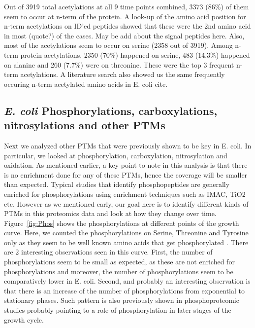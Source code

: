 \documentclass[12pt]{article}
\begin{document}
Out of 3919 total acetylations at all 9 time points combined, 3373 (86\%) of them seem to occur at n-term of the protein. A look-up of the amino acid position for n-term acetylations on ID'ed peptides showed that these were the 2nd amino acid in most (quote?) of the cases. {May be add about the signal peptides here}. Also, most of the acetylations seem to occur on serine (2358 out of 3919). Among n-term protein acetylations, 2350 (70\%) happened on serine, 483 (14.3\%) happened on alanine and 260 (7.7\%) were on threonine. These were the top 3 frequent n-term acetylations. A literature search also showed us the same frequently occuring n-term acetylated amino acids in E. coli {cite}.


\subsection{\emph{E. coli} Phosphorylations, carboxylations, nitrosylations and other PTMs}

Next we analyzed other PTMs that were previously shown to be key in E. coli. In particular, we looked at phosphorylation, carboxylation, nitrosylation and oxidation. As mentioned earlier, a key point to note in this analysis is that there is no enrichment done for any of these PTMs, hence the coverage will be smaller than expected. Typical studies that identify phosphopeptides are generally enriched for phosphorylations using enrichment techniques such as IMAC, TiO2 etc. However as we mentioned early, our goal here is to identify different kinds of PTMs in this proteomics data and look at how they change over time. Figure~\ref{fig:Phos} shows the phosphorylations at different points of the growth curve. Here, we counted the phosphorylations on Serine, Threonine and Tyrosine only as they seem to be well known amino acids that get phosphorylated \cite{Maceketal2008}. There are 2 interesting observations seen in this curve. First, the number of phosphorylations seem to be small as expected, as these are not enriched for phosphorylations and moreover, the number of phosphorylations seem to be comparatively lower in E. coli. Second, and probably an interesting observation is that there is an increase of the number of phosphorylations from exponential to stationary phases. Such pattern is also previously shown in phosphoproteomic studies \cite{Soaresetal2013} probably pointing to a role of phosphorylation in later stages of the growth cycle.
\end{document}

